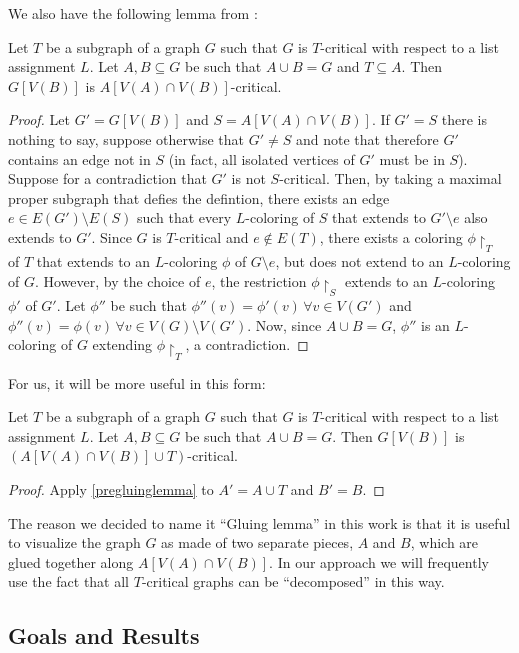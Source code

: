 We also have the following lemma from \cite{fivelistcoloring2}:

\begin{lemma}
\label{pregluinglemma}
Let $T$ be a subgraph of a graph $G$ such that $G$ is $T$-critical with respect to a list assignment $L$. Let $A, B \subseteq G$ be such that $A \cup B = G$ and $T \subseteq A$. Then $G[V(B)]$ is $A[V(A) \cap V(B)]$-critical.
\end{lemma}

\begin{proof} 
Let $G' = G[V(B)]$ and $S = A[V(A) \cap V(B)]$. If $G' = S$ there is nothing to say, suppose otherwise that $G' \neq S$ and note that therefore $G'$ contains an edge not in $S$ (in fact, all isolated vertices of $G'$ must be in $S$). Suppose for a contradiction that $G'$ is not $S$-critical. Then, by taking a maximal proper subgraph that defies the defintion, there exists an edge $e \in E(G') \setminus E(S)$ such that every $L$-coloring of $S$ that extends to $G' \setminus e$ also extends to $G'$. Since $G$ is $T$-critical and $e \not\in E(T)$, there exists a coloring $\phi\restriction_T$ of $T$ that extends to an $L$-coloring $\phi$ of $G \setminus e$, but does not extend to an $L$-coloring of $G$. However, by the choice of $e$, the restriction $\phi\restriction_S$ extends to an $L$-coloring $\phi'$ of $G'$. Let $\phi''$ be such that $\phi''(v) = \phi'(v) \, \forall v \in V(G')$ and $\phi''(v) = \phi(v) \, \forall v \in V(G) \setminus V(G')$. Now, since $A \cup B = G$, $\phi''$ is an $L$-coloring of $G$ extending $\phi\restriction_T$, a contradiction.
\end{proof}

For us, it will be more useful in this form: 

\begin{lemma}
\label{gluinglemma}
Let $T$ be a subgraph of a graph $G$ such that $G$ is $T$-critical with respect to a list assignment $L$. Let $A, B \subseteq G$ be such that $A \cup B = G$. Then $G[V(B)]$ is $(A[V(A) \cap V(B)] \cup T)$-critical.
\end{lemma}

\begin{proof} 
Apply \ref{pregluinglemma} to $A' = A \cup T$ and $B' = B$. 
\end{proof}


The reason we decided to name it ``Gluing lemma'' in this work is that it is useful to visualize the graph $G$ as made of two separate pieces, $A$ and $B$, which are glued together along $A[V(A) \cap V(B)]$. In our approach we will frequently use the fact that all $T$-critical graphs can be ``decomposed'' in this way. 


\subsection{Goals and Results}

